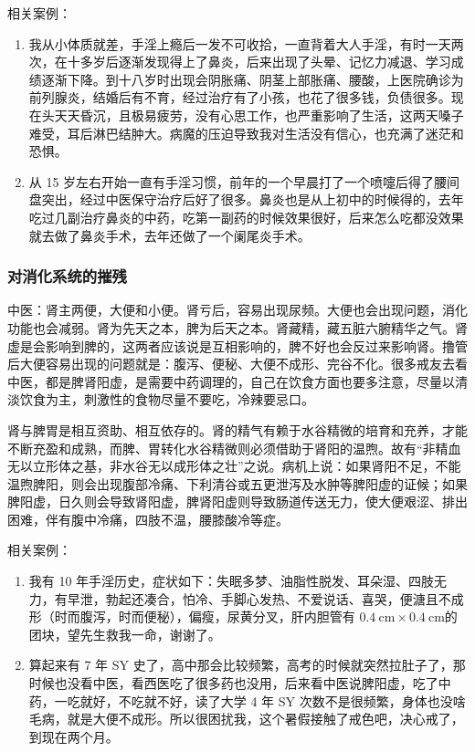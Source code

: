 \documentclass{ctexart}
\begin{document}
相关案例：

\begin{enumerate}
    \item 我从小体质就差，手淫上瘾后一发不可收拾，一直背着大人手淫，有时一天两次，在十多岁后逐渐发现得上了鼻炎，后来出现了头晕、记忆力减退、学习成绩逐渐下降。到十八岁时出现会阴胀痛、阴茎上部胀痛、腰酸，上医院确诊为前列腺炎，结婚后有不育，经过治疗有了小孩，也花了很多钱，负债很多。现在头天天昏沉，且极易疲劳，没有心思工作，也严重影响了生活，这两天嗓子难受，耳后淋巴结肿大。病魔的压迫导致我对生活没有信心，也充满了迷茫和恐惧。
    \item 从 15 岁左右开始一直有手淫习惯，前年的一个早晨打了一个喷嚏后得了腰间盘突出，经过中医保守治疗后好了很多。鼻炎也是从上初中的时候得的，去年吃过几副治疗鼻炎的中药，吃第一副药的时候效果很好，后来怎么吃都没效果就去做了鼻炎手术，去年还做了一个阑尾炎手术。
\end{enumerate}

\subsubsection{对消化系统的摧残}

中医：肾主两便，大便和小便。肾亏后，容易出现尿频。大便也会出现问题，消化功能也会减弱。肾为先天之本，脾为后天之本。肾藏精，藏五脏六腑精华之气。肾虚是会影响到脾的，这两者应该说是互相影响的，脾不好也会反过来影响肾。撸管后大便容易出现的问题就是：腹泻、便秘、大便不成形、完谷不化。很多戒友去看中医，都是脾肾阳虚，是需要中药调理的，自己在饮食方面也要多注意，尽量以清淡饮食为主，刺激性的食物尽量不要吃，冷辣要忌口。

肾与脾胃是相互资助、相互依存的。肾的精气有赖于水谷精微的培育和充养，才能不断充盈和成熟，而脾、胃转化水谷精微则必须借助于肾阳的温煦。故有“非精血无以立形体之基，非水谷无以成形体之壮”之说。病机上说：如果肾阳不足，不能温煦脾阳，则会出现腹部冷痛、下利清谷或五更泄泻及水肿等脾阳虚的证候；如果脾阳虚，日久则会导致肾阳虚，脾肾阳虚则导致肠道传送无力，使大便艰涩、排出困难，伴有腹中冷痛，四肢不温，腰膝酸冷等症。

相关案例：

\begin{enumerate}
    \item 我有 10 年手淫历史，症状如下：失眠多梦、油脂性脱发、耳朵湿、四肢无力，有早泄，勃起还凑合，怕冷、手脚心发热、不爱说话、喜哭，便溏且不成形（时而腹泻，时而便秘），偏瘦，尿黄分叉，肝内胆管有 $\SI{0.4}{\centi\metre} \times \SI{0.4}{\centi\metre}$的团块，望先生救我一命，谢谢了。
    \item 算起来有 7 年 SY 史了，高中那会比较频繁，高考的时候就突然拉肚子了，那时候也没看中医，看西医吃了很多药也没用，后来看中医说脾阳虚，吃了中药，一吃就好，不吃就不好，读了大学 4 年 SY 次数不是很频繁，身体也没啥毛病，就是大便不成形。所以很困扰我，这个暑假接触了戒色吧，决心戒了，到现在两个月。
\end{enumerate}
\end{document}
